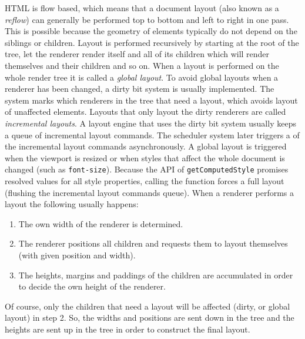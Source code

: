 \documentclass[a4paper,11pt]{kth-mag}
\newcommand{\code}[1]{\texttt{#1}}
\begin{document}
        \gls{HTML} is flow based, which means that a \gls{document} layout (also known as a \emph{reflow}) can generally be performed top to bottom and left to right in one pass.
        This is possible because the geometry of \glspl{element} typically do not depend on the siblings or children.
        Layout is performed recursively by starting at the root of the tree, let the renderer render itself and all of its children which will render themselves and their children and so on.
        When a layout is performed on the whole \gls{render tree} it is called a \emph{global layout}.
        To avoid global layouts when a renderer has been changed, a dirty bit system is usually implemented.
        The system marks which renderers in the tree that need a layout, which avoids layout of unaffected \glspl{element}.
        Layouts that only layout the dirty renderers are called \emph{incremental layouts}.
        A \gls{layout engine} that uses the dirty bit system usually keeps a queue of incremental layout commands.
        The scheduler system later triggers a  of the incremental layout commands asynchronously.
        A global layout is triggered when the \gls{viewport} is resized or when styles that affect the whole \gls{document} is changed (such as \code{font-size}).
        Because the \gls{API} of \code{getComputedStyle} promises resolved values for all style properties, calling the function forces a full layout (flushing the incremental layout commands queue).
        When a renderer performs a layout the following usually happens:
        \begin{enumerate}
          \item The own width of the renderer is determined.
          \item The renderer positions all children and requests them to layout themselves (with given position and width).
          \item The heights, margins and paddings of the children are accumulated in order to decide the own height of the renderer.
        \end{enumerate}
        Of course, only the children that need a layout will be affected (dirty, or global layout) in step 2.
        So, the widths and positions are sent down in the tree and the heights are sent up in the tree in order to construct the final layout.
\end{document}
